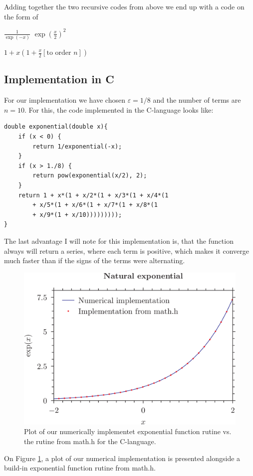 \documentclass[a4paper,12pt,amsmath,amssymb,aps]{article}
\begin{document}
Adding together the two recursive codes from above we end up with a code on the form of
\begin{algorithmic}
	\Return $\frac{1}{\exp(-x)}$
	\EndIf
	\Return $\exp\left( \frac{x}{2} \right)^2$
	\EndIf

	\Return $1 + x\left( 1 + \frac{x}{2} \left[ \text{to order $n$} \right] \right)$
	\EndFunction
\end{algorithmic}


\subsection*{Implementation in C}

For our implementation we have chosen $\varepsilon = 1/8$ and the number of terms are $n = 10$. For this, the code implemented in the C-language looks like:
\begin{lstlisting}
double exponential(double x){
	if (x < 0) {
		return 1/exponential(-x);
	}
	if (x > 1./8) {
		return pow(exponential(x/2), 2);
	}
	return 1 + x*(1 + x/2*(1 + x/3*(1 + x/4*(1
		+ x/5*(1 + x/6*(1 + x/7*(1 + x/8*(1
		+ x/9*(1 + x/10)))))))));
}
\end{lstlisting}

The last advantage I will note for this implementation is, that the function always will return a series, where each term is positive, which makes it converge much faster than if the signs of the terms were alternating.

\begin{figure}[!h]
	\includegraphics[width = \textwidth]{plot.png}
	\caption{Plot of our numerically implementet exponential function rutine vs. the rutine from math.h for the C-language.}
	\label{fig:plot}
\end{figure}

On Figure \ref{fig:plot}, a plot of our numerical implementation is presented alongside a build-in exponential function rutine from math.h.
\end{document}
